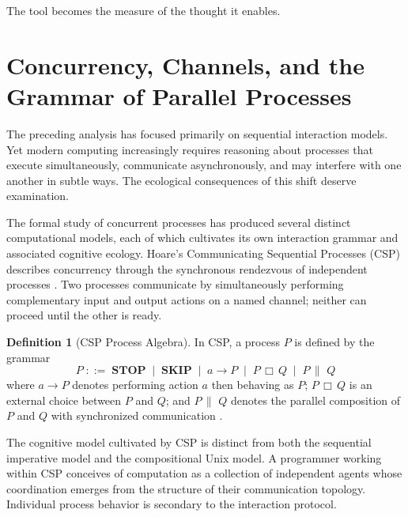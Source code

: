 \documentclass[12pt]{article}
\theoremstyle{definition}
\newtheorem{definition}{Definition}[section]
\begin{document}
The tool becomes the measure of the thought it enables.

\section{Concurrency, Channels, and the Grammar of Parallel Processes}

The preceding analysis has focused primarily on sequential interaction
models. Yet modern computing increasingly requires reasoning about
processes that execute simultaneously, communicate asynchronously, and
may interfere with one another in subtle ways. The ecological
consequences of this shift deserve examination.

The formal study of concurrent processes has produced several distinct
computational models, each of which cultivates its own interaction
grammar and associated cognitive ecology. Hoare's Communicating
Sequential Processes (\textsf{CSP}) describes concurrency through the
synchronous rendezvous of independent processes \cite{hoare1985}. Two
processes communicate by simultaneously performing complementary input
and output actions on a named channel; neither can proceed until the
other is ready.

\begin{definition}[CSP Process Algebra]
In \textsf{CSP}, a process $P$ is defined by the grammar
\[
P \;::=\; \mathbf{STOP} \;\mid\; \mathbf{SKIP} \;\mid\; a \to P
        \;\mid\; P \,\Box\, Q \;\mid\; P \,\|\,\, Q
\]
where $a \to P$ denotes performing action $a$ then behaving as $P$;
$P \,\Box\, Q$ is an external choice between $P$ and $Q$; and
$P \,\|\,\, Q$ denotes the parallel composition of $P$ and $Q$ with
synchronized communication \cite{hoare1985}.
\end{definition}

The cognitive model cultivated by \textsf{CSP} is distinct from both
the sequential imperative model and the compositional Unix model. A
programmer working within \textsf{CSP} conceives of computation as a
collection of independent agents whose coordination emerges from the
structure of their communication topology. Individual process behavior
is secondary to the interaction protocol.
\end{document}
